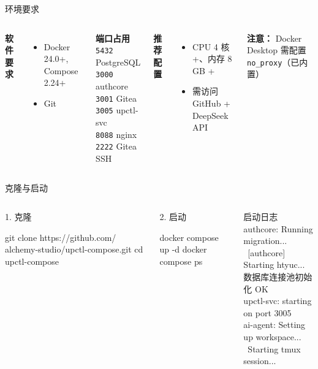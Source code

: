 \documentclass[10pt,aspectratio=169,utf8]{beamer}
\begin{document}
\begin{frame}{环境要求}
  \small
  \begin{columns}[T]
    \textbf{软件要求}
    \begin{itemize}
      \item Docker 24.0+, Compose 2.24+
      \item Git
    \end{itemize}
    \textbf{端口占用}\\
    \texttt{5432} PostgreSQL \quad \texttt{3000} authcore\\
    \texttt{3001} Gitea \quad \texttt{3005} upctl-svc\\
    \texttt{8088} nginx \quad \texttt{2222} Gitea SSH

    \textbf{推荐配置}
    \begin{itemize}
      \item CPU 4 核 +、内存 8 GB +
      \item 需访问 GitHub + DeepSeek API
    \end{itemize}
    \textcolor{myred}{\textbf{注意：}} Docker Desktop 需配置 \texttt{no\_proxy}（已内置）
  \end{columns}
\end{frame}

\begin{frame}[fragile]{克隆与启动}
  \begin{columns}[T]
    \begin{block}{1. 克隆}
      \begin{code}
git clone https://github.com/
  alchemy-studio/upctl-compose.git
cd upctl-compose
      \end{code}
    \end{block}
    \begin{block}{2. 启动}
      \begin{code}
docker compose up -d
docker compose ps
      \end{code}
    \end{block}

    \begin{block}{启动日志}
      \tiny
      authcore: Running migration...\\
      \relax\ [authcore] Starting htyuc...\\
      数据库连接池初始化 OK\\
      upctl-svc: starting on port 3005\\
      ai-agent: Setting up workspace...\\
      \relax\ Starting tmux session...
    \end{block}
  \end{columns}
\end{frame}
\end{document}
